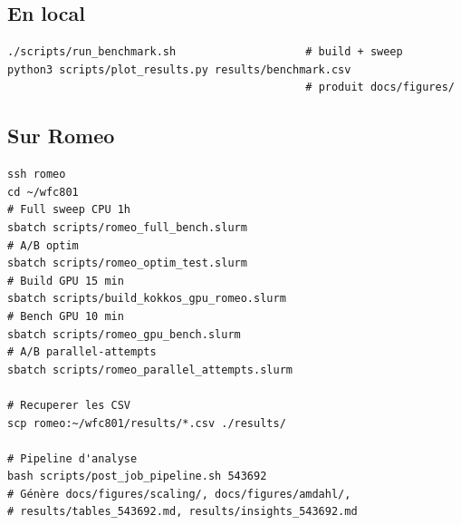 \subsection{En local}

\begin{verbatim}
./scripts/run_benchmark.sh                    # build + sweep
python3 scripts/plot_results.py results/benchmark.csv
                                              # produit docs/figures/
\end{verbatim}

\subsection{Sur Romeo}

\begin{verbatim}
ssh romeo
cd ~/wfc801
# Full sweep CPU 1h
sbatch scripts/romeo_full_bench.slurm
# A/B optim
sbatch scripts/romeo_optim_test.slurm
# Build GPU 15 min
sbatch scripts/build_kokkos_gpu_romeo.slurm
# Bench GPU 10 min
sbatch scripts/romeo_gpu_bench.slurm
# A/B parallel-attempts
sbatch scripts/romeo_parallel_attempts.slurm

# Recuperer les CSV
scp romeo:~/wfc801/results/*.csv ./results/

# Pipeline d'analyse
bash scripts/post_job_pipeline.sh 543692
# Génère docs/figures/scaling/, docs/figures/amdahl/,
# results/tables_543692.md, results/insights_543692.md
\end{verbatim}
